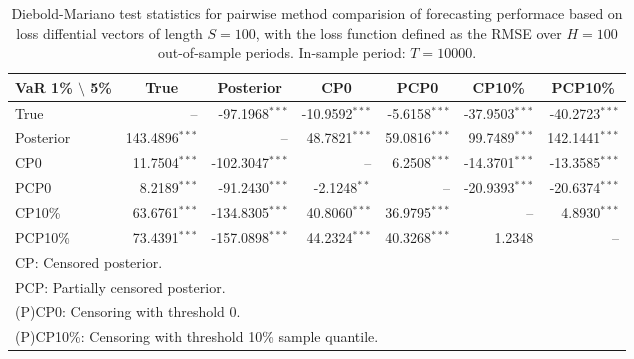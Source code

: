 { \renewcommand{\arraystretch}{1.2} 
\begin{table} 
\center 
\begin{tabular}{l | rrr rrr} 
VaR 1\% $\setminus$ 5\% & \multicolumn{1}{c}{True} & \multicolumn{1}{c}{Posterior} & \multicolumn{1}{c}{CP0} & \multicolumn{1}{c}{PCP0} & \multicolumn{1}{c}{CP10\%} & \multicolumn{1}{c}{PCP10\%} \\ \hline 
True &    --\phantom{$^{***}$} & -97.1968$^{***}$ & -10.9592$^{***}$ & -5.6158$^{***}$ & -37.9503$^{***}$ & -40.2723$^{***}$  \\ 
Posterior & 143.4896$^{***}$ &    --\phantom{$^{***}$} & 48.7821$^{***}$ & 59.0816$^{***}$ & 99.7489$^{***}$ & 142.1441$^{***}$  \\ 
CP0 & 11.7504$^{***}$ & -102.3047$^{***}$ &    --\phantom{$^{***}$} & 6.2508$^{***}$ & -14.3701$^{***}$ & -13.3585$^{***}$  \\ 
PCP0 & 8.2189$^{***}$ & -91.2430$^{***}$ & -2.1248$^{**}$\phantom{$^{*}$} &    --\phantom{$^{***}$} & -20.9393$^{***}$ & -20.6374$^{***}$  \\ 
CP10\% & 63.6761$^{***}$ & -134.8305$^{***}$ & 40.8060$^{***}$ & 36.9795$^{***}$ &    --\phantom{$^{***}$} & 4.8930$^{***}$  \\ 
PCP10\% & 73.4391$^{***}$ & -157.0898$^{***}$ & 44.2324$^{***}$ & 40.3268$^{***}$ & 1.2348\phantom{$^{***}$} &    --\phantom{$^{***}$}  \\ 
\hline 
\multicolumn{7}{l}{\footnotesize{CP: Censored posterior.}}  \\ 
\multicolumn{7}{l}{\footnotesize{PCP: Partially censored posterior.}} \\ 
\multicolumn{7}{l}{\footnotesize{(P)CP0: Censoring with threshold 0.}} \\ 
\multicolumn{7}{l}{\footnotesize{(P)CP10\%: Censoring with threshold 10\% sample quantile.}}  \\ 
\end{tabular}
 \caption{Diebold-Mariano test statistics for  pairwise method comparision of forecasting performace based on loss diffential vectors of length $S = 100$, with the loss function defined as the RMSE over $H=100$ out-of-sample periods. In-sample period: $T = 10000$.} 
\label{tab:ar1_DM_T_10000}  
\end{table}
}